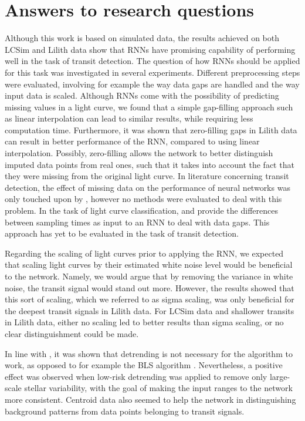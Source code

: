 
\section{Answers to research questions}

Although this work is based on simulated data, the results achieved on both LCSim and Lilith data show that RNNs have promising capability of performing well in the task of transit detection. The question of how RNNs should be applied for this task was investigated in several experiments. Different preprocessing steps were evaluated, involving for example the way data gaps are handled and the way input data is scaled. Although RNNs come with the possibility of predicting missing values in a light curve, we found that a simple gap-filling approach such as linear interpolation can lead to similar results, while requiring less computation time. Furthermore, it was shown that zero-filling gaps in Lilith data can result in better performance of the RNN, compared to using linear interpolation. Possibly, zero-filling allows the network to better distinguish imputed data points from real ones, such that it takes into account the fact that they were missing from the original light curve. In literature concerning transit detection, the effect of missing data on the performance of neural networks was only touched upon by \cite{pearson2018searching}, however no methods were evaluated to deal with this problem. In the task of light curve classification, \cite{naul2018recurrent} and \cite{becker2020scalable} provide the differences between sampling times as input to an RNN to deal with data gaps. This approach has yet to be evaluated in the task of transit detection.

Regarding the scaling of light curves prior to applying the RNN, we expected that scaling light curves by their estimated white noise level would be beneficial to the network. Namely, we would argue that by removing the variance in white noise, the transit signal would stand out more. However, the results showed that this sort of scaling, which we referred to as sigma scaling, was only beneficial for the deepest transit signals in Lilith data. For LCSim data and shallower transits in Lilith data, either no scaling led to better results than sigma scaling, or no clear distinguishment could be made.

In line with \cite{pearson2018searching}, it was shown that detrending is not necessary for the algorithm to work, as opposed to for example the BLS algorithm \cite{kovacs2002box}. Nevertheless, a positive effect was observed when low-risk detrending was applied to remove only large-scale stellar variability, with the goal of making the input ranges to the network more consistent. Centroid data also seemed to help the network in distinguishing background patterns from data points belonging to transit signals. 

